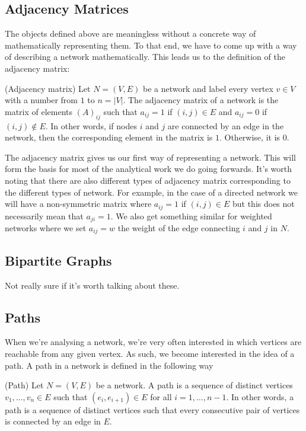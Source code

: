 \subsection{Adjacency Matrices}
The objects defined above are meaningless without a concrete way of mathematically representing them. To that end, we have to come up with a way of describing a network mathematically. This leads us to the definition of the adjacency matrix:

\begin{definition}{(Adjacency matrix)}
    Let $N = (V, E)$ be a network and label every vertex $v \in V$ with a number from $1$ to $n = |V|$. The adjacency matrix of a network is the matrix of elements $(A)_{ij}$ such that $a_{ij} = 1$ if $(i, j) \in E$ and $a_{ij} = 0$ if $(i, j) \notin E$. In other words, if nodes $i$ and $j$ are connected by an edge in the network, then the corresponding element in the matrix is $1$. Otherwise, it is $0$.\label{def:adjacency_matrix}
\end{definition}

The adjacency matrix gives us our first way of representing a network. This will form the basis for most of the analytical work we do going forwards. It's worth noting that there are also different types of adjacency matrix corresponding to the different types of network. For example, in the case of a directed network we will have a non-symmetric matrix where $a_{ij} = 1$ if $(i, j) \in E$ but this does not necessarily mean that $a_{ji} = 1$. We also get something similar for weighted networks where we set $a_{ij} = w$ the weight of the edge connecting $i$ and $j$ in $N$.

\subsection{Bipartite Graphs}
Not really sure if it's worth talking about these.

\subsection{Paths}
When we're analysing a network, we're very often interested in which vertices are reachable from any given vertex. As such, we become interested in the idea of a path. A path in a network is defined in the following way

\begin{definition}{(Path)}
    Let $N = (V, E)$ be a network. A path is a sequence of distinct vertices $v_1, \dots, v_n \in E$ such that $(e_i, e_{i+1}) \in E$ for all $i = 1, \dots, n-1$. In other words, a path is a sequence of distinct vertices such that every consecutive pair of vertices is connected by an edge in $E$.
\end{definition}


